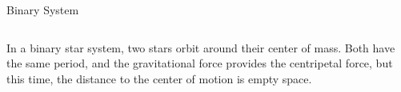 \documentclass[12pt,compress,aspectratio=169]{beamer}
\begin{document}
\begin{frame}{Binary System}
  \begin{columns}

    In a binary star system, two stars orbit around their center of mass. Both
    have the same period, and the gravitational force provides the centripetal
    force, but this time, the distance to the center of motion is empty space.
  \end{columns}
\end{frame}
\end{document}
